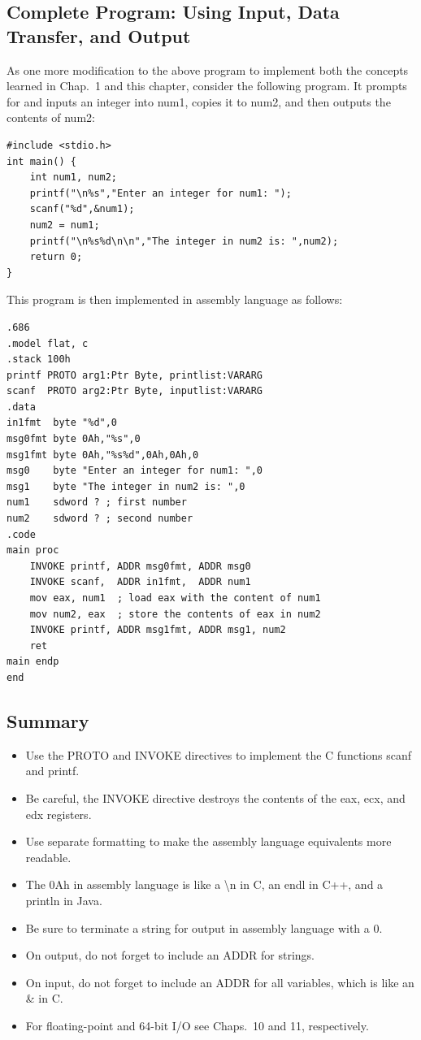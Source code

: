 \documentclass[10pt]{book}
\begin{document}
\subsection{Complete Program: Using Input, Data Transfer, and Output}
As one more modification to the above program to implement both the concepts learned in Chap.~1 and this chapter, consider the following program. It prompts for and inputs an integer into num1, copies it to num2, and then outputs the contents of num2:

\begin{verbatim}
#include <stdio.h>
int main() {
    int num1, num2;
    printf("\n%s","Enter an integer for num1: ");
    scanf("%d",&num1);
    num2 = num1;
    printf("\n%s%d\n\n","The integer in num2 is: ",num2);
    return 0;
}
\end{verbatim}

This program is then implemented in assembly language as follows:

\begin{verbatim}
.686
.model flat, c
.stack 100h
printf PROTO arg1:Ptr Byte, printlist:VARARG
scanf  PROTO arg2:Ptr Byte, inputlist:VARARG
.data
in1fmt  byte "%d",0
msg0fmt byte 0Ah,"%s",0
msg1fmt byte 0Ah,"%s%d",0Ah,0Ah,0
msg0    byte "Enter an integer for num1: ",0
msg1    byte "The integer in num2 is: ",0
num1    sdword ? ; first number
num2    sdword ? ; second number
.code
main proc
    INVOKE printf, ADDR msg0fmt, ADDR msg0
    INVOKE scanf,  ADDR in1fmt,  ADDR num1
    mov eax, num1  ; load eax with the content of num1
    mov num2, eax  ; store the contents of eax in num2
    INVOKE printf, ADDR msg1fmt, ADDR msg1, num2
    ret
main endp
end
\end{verbatim}

\subsection{Summary}
\begin{itemize}
  \item Use the PROTO and INVOKE directives to implement the C functions scanf and printf.
  \item Be careful, the INVOKE directive destroys the contents of the eax, ecx, and edx registers.
  \item Use separate formatting to make the assembly language equivalents more readable.
  \item The 0Ah in assembly language is like a \textbackslash n in C, an endl in C++, and a println in Java.
  \item Be sure to terminate a string for output in assembly language with a 0.
  \item On output, do not forget to include an ADDR for strings.
  \item On input, do not forget to include an ADDR for all variables, which is like an \& in C.
  \item For floating-point and 64-bit I/O see Chaps.~10 and 11, respectively.
\end{itemize}
\end{document}
